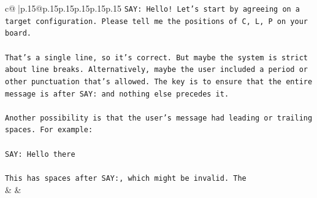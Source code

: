 \documentclass{article}
\begin{document}
{\begin{supertabular}{c@{$\;$}|p{.15\linewidth}@{}p{.15\linewidth}p{.15\linewidth}p{.15\linewidth}p{.15\linewidth}p{.15\linewidth}}
{{{\texttt{SAY: Hello! Let's start by agreeing on a target configuration. Please tell me the positions of C, L, P on your board.} \\
\\ 
\texttt{That's a single line, so it's correct. But maybe the system is strict about line breaks. Alternatively, maybe the user included a period or other punctuation that's allowed. The key is to ensure that the entire message is after SAY: and nothing else precedes it.} \\
\\ 
\texttt{Another possibility is that the user's message had leading or trailing spaces. For example:} \\
\\ 
\texttt{SAY:   Hello there} \\
\\ 
\texttt{This has spaces after SAY:, which might be invalid. The} \\
            }
        }
    }
    & & \\ \\


\end{supertabular}}
\end{document}
